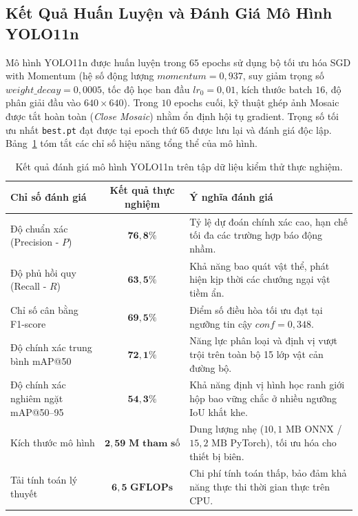 \subsection{Kết Quả Huấn Luyện và Đánh Giá Mô Hình YOLO11n}
\label{subsec:ket_qua_huan_luyen_yolo11n}

Mô hình YOLO11n được huấn luyện trong $65$ epochs sử dụng bộ tối ưu hóa SGD with Momentum (hệ số động lượng $momentum = 0,937$, suy giảm trọng số $weight\_decay = 0,0005$, tốc độ học ban đầu $lr_0 = 0,01$, kích thước batch $16$, độ phân giải đầu vào $640 \times 640$). Trong $10$ epochs cuối, kỹ thuật ghép ảnh Mosaic được tắt hoàn toàn (\textit{Close Mosaic}) nhằm ổn định hội tụ gradient. Trọng số tối ưu nhất \texttt{best.pt} đạt được tại epoch thứ $65$ được lưu lại và đánh giá độc lập. Bảng~\ref{tab:test_metrics_overall} tóm tắt các chỉ số hiệu năng tổng thể của mô hình.

\begin{table}[htbp]
\centering
\caption{Kết quả đánh giá mô hình YOLO11n trên tập dữ liệu kiểm thử thực nghiệm.}
\label{tab:test_metrics_overall}
\begin{tabular}{|l|c|p{7.5cm}|}
\hline
\textbf{Chỉ số đánh giá} & \textbf{Kết quả thực nghiệm} & \textbf{Ý nghĩa đánh giá} \\ \hline
Độ chuẩn xác (Precision - $P$) & $\mathbf{76,8\%}$ & Tỷ lệ dự đoán chính xác cao, hạn chế tối đa các trường hợp báo động nhầm. \\ \hline
Độ phủ hồi quy (Recall - $R$) & $\mathbf{63,5\%}$ & Khả năng bao quát vật thể, phát hiện kịp thời các chướng ngại vật tiềm ẩn. \\ \hline
Chỉ số cân bằng F1-score & $\mathbf{69,5\%}$ & Điểm số điều hòa tối ưu đạt tại ngưỡng tin cậy $conf = 0,348$. \\ \hline
Độ chính xác trung bình mAP@50 & $\mathbf{72,1\%}$ & Năng lực phân loại và định vị vượt trội trên toàn bộ 15 lớp vật cản đường bộ. \\ \hline
Độ chính xác nghiêm ngặt mAP@50--95 & $\mathbf{54,3\%}$ & Khả năng định vị hình học ranh giới hộp bao vững chắc ở nhiều ngưỡng IoU khắt khe. \\ \hline
Kích thước mô hình & $\mathbf{2,59\text{ M tham số}}$ & Dung lượng nhẹ ($10,1\text{ MB}$ ONNX / $15,2\text{ MB}$ PyTorch), tối ưu hóa cho thiết bị biên. \\ \hline
Tải tính toán lý thuyết & $\mathbf{6,5\text{ GFLOPs}}$ & Chi phí tính toán thấp, bảo đảm khả năng thực thi thời gian thực trên CPU. \\ \hline
\end{tabular}
\end{table}

